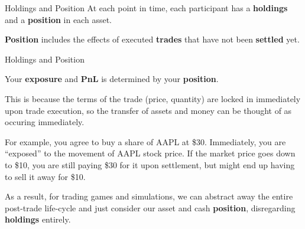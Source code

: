 \begin{frame}{Holdings and Position}
  At each point in time, each participant has a \textbf{holdings} and a \textbf{position} in each asset.
  \begin{sqt:definition}
    \textbf{Position} includes the effects of executed \textbf{trades} that have not been \textbf{settled} yet.
  \end{sqt:definition}

  \begin{center}
    
  \end{center}
\end{frame}

\begin{frame}{Holdings and Position}
  \begin{sqt:result}
    Your \textbf{exposure} and \textbf{PnL} is determined by your \textbf{position}.
  \end{sqt:result}

  This is because the terms of the trade (price, quantity) are locked in immediately upon trade execution,
  so the transfer of assets and money can be thought of as occuring immediately.

  \begin{sqt:tip}
    For example, you agree to buy a share of AAPL at \$30.
    Immediately, you are ``exposed'' to the movement of AAPL stock price.
    If the market price goes down to \$10, you are still paying \$30 for it upon settlement,
    but might end up having to sell it away for \$10.
  \end{sqt:tip}

  As a result, for trading games and simulations, we can abstract away the entire post-trade life-cycle
  and just consider our asset and cash \textbf{position}, disregarding \textbf{holdings} entirely.
\end{frame}

